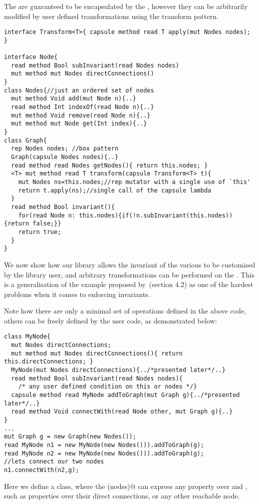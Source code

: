 The \Q@Node@s are guaranteed to be encapsulated by the \Q@Graph@, however they can be arbitrarily modified by user defined transformations using the transform pattern.
\begin{lstlisting}
interface Transform<T>{ capsule method read T apply(mut Nodes nodes); }

interface Node{
  read method Bool subInvariant(read Nodes nodes)
  mut method mut Nodes directConnections()
}
class Nodes{//just an ordered set of nodes 
  mut method Void add(mut Node n){..}
  read method Int indexOf(read Node n){..}
  mut method Void remove(read Node n){..}
  mut method mut Node get(Int index){..}
}
class Graph{ 
  rep Nodes nodes; //box pattern
  Graph(capsule Nodes nodes){..}
  read method read Nodes getNodes(){ return this.nodes; }
  <T> mut method read T transform(capsule Transform<T> t){
    mut Nodes ns=this.nodes;//rep mutator with a single use of `this'
    return t.apply(ns);//single call of the capsule lambda
  }
  read method Bool invariant(){
    for(read Node n: this.nodes){if(!n.subInvariant(this.nodes)){return false;}}
    return true;
  }
}
\end{lstlisting}
We now show how our \Q@Graph@ library allows the invariant of the various \Q@Node@s to be customised by the library user, and arbitrary transformations can be performed on the \Q@Graph@s. This is a generalisation of the example proposed by~\cite{Summers:2009:NFO:1562154.1562160}(section 4.2) as one of the hardest problems when it comes to enforcing invariants.

Note how there are only a minimal set of operations defined in the above code, 
others can be freely defined by the user code, as demonstrated below:

\begin{lstlisting}
class MyNode{
  mut Nodes directConnections;
  mut method mut Nodes directConnections(){ return this.directConnections; }
  MyNode(mut Nodes directConnections){../*presented later*/..}
  read method Bool subInvariant(read Nodes nodes){
    /* any user defined condition on this or nodes */}  
  capsule method read MyNode addToGraph(mut Graph g){../*presented later*/..}
  read method Void connectWith(read Node other, mut Graph g){..}
}
...
mut Graph g = new Graph(new Nodes());
read MyNode n1 = new MyNode(new Nodes())).addToGraph(g);
read MyNode n2 = new MyNode(new Nodes())).addToGraph(g);
//lets connect our two nodes
n1.connectWith(n2,g);
\end{lstlisting}
Here we define a \Q@MyNode@ class, where the \Q@subInvariant(nodes)@ can express any property over \Q@this@ and \Q@nodes@, such as properties over their direct connections, or any other reachable node.

